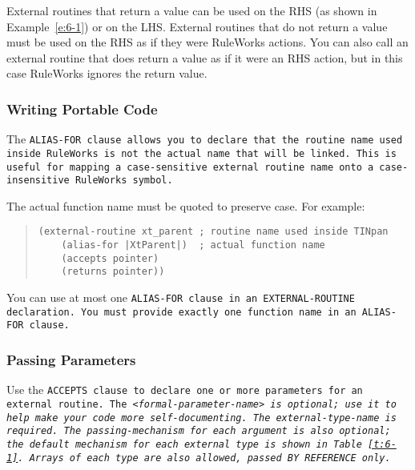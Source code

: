 External routines that return a value can be used on the RHS (as shown
in Example~\ref{e:6-1}) or on the LHS. External routines that do not return a
value must be used on the RHS as if they were RuleWorks actions. You
can also call an external routine that does return a value as if it
were an RHS action, but in this case RuleWorks ignores the return
value.

\subsubsection{Writing Portable Code}

The \tt{ALIAS-FOR} clause allows you to declare that the routine name
used inside RuleWorks is not the actual name that will be linked. This
is useful for mapping a case-sensitive external routine name onto a
case-insensitive RuleWorks symbol.

The actual function name must be quoted to preserve case. For example:

\begin{quote}
\begin{verbatim}
(external-routine xt_parent ; routine name used inside TINpan
    (alias-for |XtParent|)  ; actual function name
    (accepts pointer)
    (returns pointer))
\end{verbatim}
\end{quote}

You can use at most one \tt{ALIAS-FOR} clause in an \tt{EXTERNAL-ROUTINE}
declaration. You must provide exactly one function name in an
\tt{ALIAS-FOR} clause.

\subsubsection{Passing Parameters}

Use the \tt{ACCEPTS} clause to declare one or more parameters for an
external routine. The \verb|<|\it{formal-parameter-name}\verb|>| is
optional; use it to help make your code more self-documenting. The
external-type-name is required. The passing-mechanism for each
argument is also optional; the default mechanism for each external
type is shown in Table~\ref{t:6-1}. Arrays of each type are also
allowed, passed \tt{BY REFERENCE} only.

